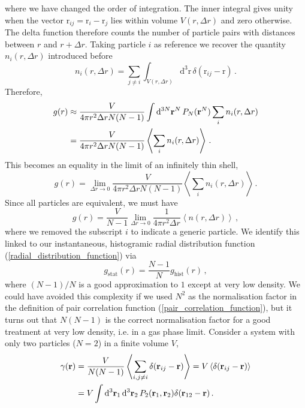\documentclass{article}
\theoremstyle{plain}\theoremheaderfont{\normalfont\itshape}\theorembodyfont{\rmfamily}\theoremseparator{.}\newtheorem*{rem}{Remark}\newtheorem*{ex}{Example}\newtheorem*{proof}{Proof}\newtheorem*{altp}{Alternative proof}
\theoremstyle{plain}\theoremheaderfont{\normalfont\bfseries}\theorembodyfont{\rmfamily}\theoremseparator{.}\newtheorem{thm}{Theorem}[section]\newtheorem{lem}[thm]{Lemma}\newtheorem{prop}[thm]{Proposition}\newtheorem*{cor}{Corollary}\newtheorem{defn}[thm]{Definition}\newtheorem{clm}[thm]{Claim}\newtheorem{clminproof}{Claim}\newtheorem{alg}[thm]{Algorithm}\newtheorem{hyp}[thm]{Hypothesis}\newtheorem{law}[thm]{Law}
\theoremstyle{break}\theoremheaderfont{\normalfont\itshape}\theorembodyfont{\rmfamily}\theoremseparator{.\medskip}\newtheorem*{proofskip}{Proof}\newtheorem*{exs}{Examples}\newtheorem*{rems}{Remarks}
\theoremstyle{break}\theoremheaderfont{\normalfont\bfseries}\theorembodyfont{\rmfamily}\theoremseparator{.\medskip}\newtheorem{lemskip}[thm]{Lemma}\newtheorem{defnskip}[thm]{Definition}\newtheorem{propskip}[thm]{Proposition}\newtheorem{thmskip}[thm]{Theorem}
\numberwithin{equation}{section}
\newcommand{\dd}[2][]{\mathrm{d}^{#1} #2\,}
\newcommand{\eval}[1]{\left\langle #1 \right\rangle}
\newcommand{\vb}[1]{\bm{\mathrm{#1}}}
\begin{document}
    where we have changed the order of integration. The inner integral gives unity when the vector \(\vb{r}_{ij}=\vb{r}_i-\vb{r}_j\) lies within volume \(V(r,\Delta r)\) and zero otherwise. The delta function therefore counts the number of particle pairs with distances between \(r\) and \(r+\Delta r\). Taking particle \(i\) as reference we recover the quantity \(n_i(r,\Delta r)\) introduced before
    \begin{equation}
        n_i(r,\Delta r)=\sum_{j\ne i}\int_{V(r,\Delta r)}\dd[3]{\vb{r}}\delta(\vb{r}_{ij}-\vb{r})\,.
    \end{equation}
    Therefore,
    \begin{align}
        g(r)&\approx\frac{V}{4\pi r^2\Delta r N(N-1)}\int\dd[3N]{\vb{r}^N}P_N(\vb{r}^N)\sum_i n_i(r,\Delta r)\notag\\
        &=\frac{V}{4\pi r^2\Delta r N(N-1)}\eval{\sum_i n_i(r,\Delta r)}\,.
    \end{align}
    This becomes an equality in the limit of an infinitely thin shell,
    \begin{equation}
        g(r)=\lim_{\Delta r\to 0}\frac{V}{4\pi r^2\Delta r N(N-1)}\eval{\sum_i n_i(r,\Delta r)}\,.
    \end{equation}
    Since all particles are equivalent, we must have
    \begin{equation}
        g(r)=\frac{V}{N-1}\lim_{\Delta r\to 0}\frac{1}{4\pi r^2\Delta r}\eval{n(r,\Delta r)}\,,
    \end{equation}
    where we removed the subscript \(i\) to indicate a generic particle. We identify this linked to our instantaneous, histogramic radial distribution function (\ref{radial_distribution_function}) via
    \begin{equation}
        g_{\text{stat}}(r)=\frac{N-1}{N}g_{\text{hist}}(r)\,,
    \end{equation}
    where \((N-1)/N\) is a good approximation to \(1\) except at very low density. We could have avoided this complexity if we used \(N^2\) as the normalisation factor in the definition of pair correlation function (\ref{pair_correlation_function}), but it turns out that \(N(N-1)\) is the correct normalisation factor for a good treatment at very low density, i.e. in a gas phase limit. Consider a system with only two particles (\(N=2\)) in a finite volume \(V\),
    \begin{align}
        \gamma(\vb{r})&=\frac{V}{N(N-1)}\eval{\sum_{i,j\ne i}\delta(\vb{r}_{ij}-\vb{r})}=V\eval{\delta(\vb{r}_{ij}-\vb{r})}\notag \\
        &=V\int\dd[3]{\vb{r}_1}\dd[3]{\vb{r}_2}P_2(\vb{r}_1,\vb{r}_2)\delta(\vb{r}_{12}-\vb{r})\,.
    \end{align}
\end{document}
